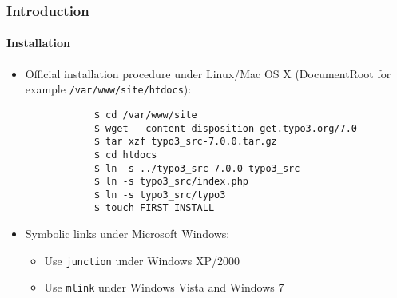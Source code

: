 \begin{frame}[fragile]
	\frametitle{Introduction}
	\framesubtitle{Installation}

	\begin{itemize}
		\item Official installation procedure under Linux/Mac OS X\newline
			(DocumentRoot for example \texttt{/var/www/site/htdocs}):
		\begin{lstlisting}
			$ cd /var/www/site
			$ wget --content-disposition get.typo3.org/7.0
			$ tar xzf typo3_src-7.0.0.tar.gz
			$ cd htdocs
			$ ln -s ../typo3_src-7.0.0 typo3_src
			$ ln -s typo3_src/index.php
			$ ln -s typo3_src/typo3
			$ touch FIRST_INSTALL
		\end{lstlisting}

		\item Symbolic links under Microsoft Windows:

			\begin{itemize}
				\item Use \texttt{junction} under Windows XP/2000
				\item Use \texttt{mlink} under Windows Vista and Windows 7
			\end{itemize}

	\end{itemize}
\end{frame}


